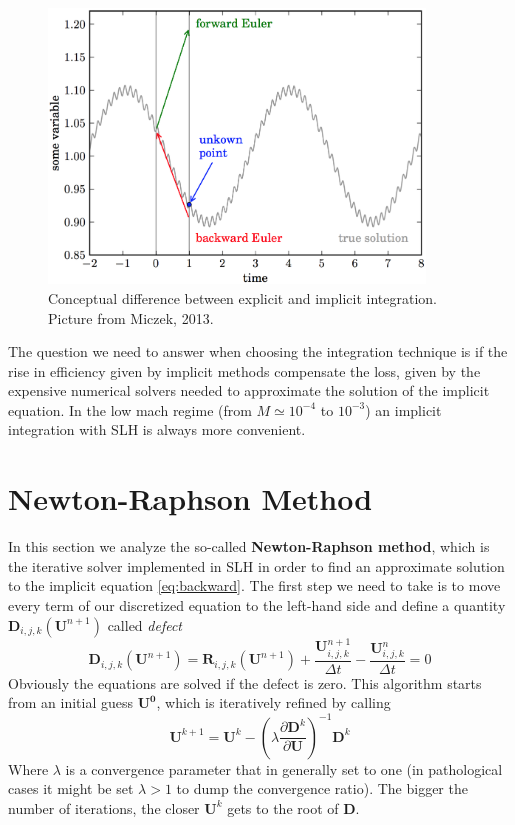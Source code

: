\begin{figure}[t]
\centering
\includegraphics[width=10cm]{./img/implicit}
\caption{Conceptual difference between explicit and implicit integration. Picture from Miczek, 2013.}
\label{fig:implicit}
\centering
\end{figure}
The question we need to answer when choosing the integration technique is if the rise in efficiency given by implicit methods compensate the loss, given by the expensive numerical solvers needed to approximate the solution of the implicit equation. In the low mach regime (from $M \simeq 10^{-4}$ to $10^{-3}$) an implicit integration with SLH is always more convenient. 

\section{Newton-Raphson Method}
In this section we analyze the so-called \textbf{Newton-Raphson method}, which is the iterative solver implemented in SLH in order to find an approximate solution to the implicit equation \ref{eq:backward}. The first step we need to take is to move every term of our discretized equation to the left-hand side and define a quantity $\mathbf{D}_{i, j, k}(\mathbf{U}^{n+1})$ called \textit{defect}
\begin{equation}\label{eq:defect}
	\mathbf{D}_{i, j, k}(\mathbf{U}^{n+1}) = \mathbf{R}_{i, j, k}(\mathbf{U}^{n+1}) + \frac{\mathbf{U}_{i, j, k}^{n+1}}{\Delta t} - \frac{\mathbf{U}^n_{i, j, k}}{\Delta t} = 0
\end{equation}
Obviously the equations are solved if the defect is zero. This algorithm starts from an initial guess $\mathbf{U^0}$, which is iteratively refined by calling
\begin{equation}\label{eq:newtonraphson}
	\mathbf{U}^{k+1} = \mathbf{U}^k - \left( \lambda \frac{\partial \mathbf{D}^k}{\partial \mathbf{U}}  \right)^{-1} \mathbf{D}^k
\end{equation}
Where $\lambda$ is a convergence parameter that in generally set to one (in pathological cases it might be set $\lambda > 1$ to dump the convergence ratio). The bigger the number of iterations, the closer $\mathbf{U}^k$ gets to the root of $\mathbf{D}$.


